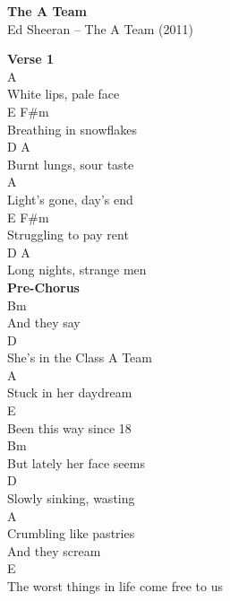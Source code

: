 \documentclass[a4paper]{article}
\begin{document}
    \begin{center}
        \textbf{The A Team}
        ~\\
        Ed Sheeran -- The A Team (2011)
    \end{center}
    {
        \scriptsize
        \textbf{Verse 1}
        ~\\
        {
            \cutive
            \obeyspaces
A
\\
White lips, pale face
\\
               E   F\#m
\\
Breathing in snowflakes
\\
              D    A
\\
Burnt lungs, sour taste
\\
A
\\
Light's gone, day's end
\\
              E    F\#m
\\
Struggling to pay rent
\\
                D    A
\\
Long nights, strange men
\\

        }
        \textbf{Pre-Chorus}
        ~\\
        {
            \cutive
            \obeyspaces
      Bm
\\
And they say
\\
                   D
\\
She's in the Class A Team
\\
               A
\\
Stuck in her daydream
\\
                    E
\\
Been this way since 18
\\
                Bm
\\
But lately her face seems
\\
                 D
\\
Slowly sinking, wasting
\\
                A
\\
Crumbling like pastries
\\
And they scream
\\
     E
\\
The worst things in life come free to us
\\

}}
\end{document}
